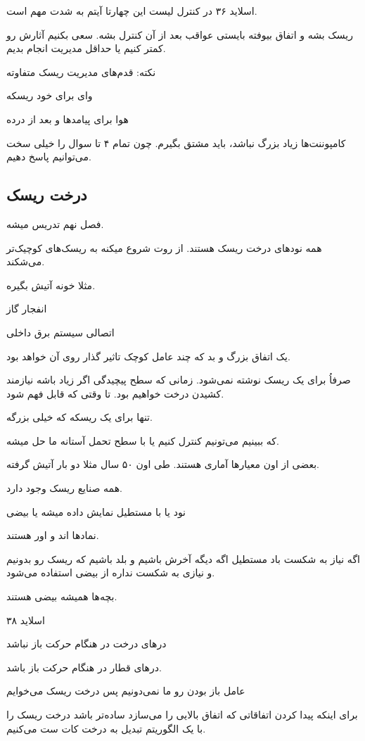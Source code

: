 اسلاید ۳۶ در کنترل لیست این چهارتا آیتم به شدت مهم است.

ریسک بشه و اتفاق بیوفته بایستی عواقب بعد از آن کنترل بشه. سعی بکنیم آثارش رو
کمتر کنیم یا حداقل مدیریت انجام بدیم.

نکته: قدم‌های مدیریت ریسک متفاوته

وای برای خود ریسکه

هوا برای پیامد‌ها و بعد از درده

کامپوننت‌ها زیاد بزرگ نباشد، باید مشتق بگیرم. چون تمام ۴ تا سوال را خیلی سخت
می‌توانیم پاسخ دهیم.

\subsection{درخت ریسک}

فصل نهم تدریس میشه.

همه نود‌های درخت ریسک هستند. از روت شروع میکنه به ریسک‌های کوچیک‌تر می‌شکند.

مثلا خونه آتیش بگیره.

انفجار گاز

اتصالی سیستم برق داخلی

یک اتفاق بزرگ و بد که چند عامل کوچک تاثیر گذار روی آن خواهد بود.

صرفاُ برای یک ریسک نوشته نمی‌شود. زمانی که سطح پیچیدگی اگر زیاد باشه نیازمند
کشیدن درخت خواهیم بود. تا وقتی که قابل فهم شود.

تنها برای یک ریسکه که خیلی بزرگه.

که ببینیم می‌تونیم کنترل کنیم یا با سطح تحمل آستانه ما حل میشه.

بعضی از اون معیار‌ها آماری هستند. طی اون ۵۰ سال مثلا دو بار آتیش گرفته.

همه صنایع ریسک وجود دارد.

نود یا با مستطیل نمایش داده میشه یا بیضی

نماد‌ها اند و اور هستند.

اگه نیاز به شکست باد مستطیل اگه دیگه آخرش باشیم و بلد باشیم که ریسک رو بدونیم و
نیازی به شکست نداره از بیضی استفاده می‌شود.

بچه‌ها همیشه بیضی هستند.

اسلاید ۳۸

در‌های درخت در هنگام حرکت باز نباشد

در‌های قطار در هنگام حرکت باز باشد.

عامل باز بودن رو ما نمی‌دونیم 
پس درخت ریسک می‌خوایم

برای اینکه پیدا کردن اتفاقاتی که اتفاق بالایی را می‌سازد ساده‌تر باشد درخت ریسک
را با یک الگوریتم تبدیل به درخت کات ست می‌کنیم.

